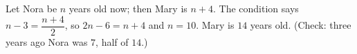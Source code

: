 Let Nora be $n$ years old now; then Mary is $n+4$. The condition says $n-3=\dfrac{n+4}{2}$, so $2n-6=n+4$ and $n=10$. Mary is $\boxed{14}$ years old. (Check: three years ago Nora was $7$, half of $14$.)
